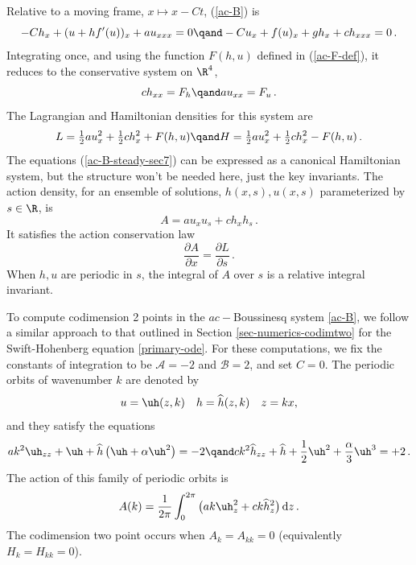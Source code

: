 \documentclass[10pt]{article}
\def\rd{{\rm d}} \def\re{{\rm e}} \def\fr{\mbox{$\frac{1}{2}$}}
\def\hh{\widehat {h}}
\def\iA{\mathscr{A}}
\def\iB{\mathscr{B}}
\begin{document}
Relative to a moving frame, $x\mapsto x-Ct$, (\ref{ac-B}) is
%
\begin{equation}\label{ac-B-sec7}
-Ch_x + (u + hf'(u))_x +a u_{xxx} =0\qand -C u_x + f(u)_x + gh_x + c h_{xxx} = 0\,.
\end{equation}
%
Integrating once, and using the function $F(h,u)$ defined in (\ref{ac-F-def}), it reduces to the conservative system on $\R^4$,
%
\begin{equation}\label{ac-B-steady-sec7}
c h_{xx} = F_h\qand a u_{xx} = F_u\,.
\end{equation}
%
The Lagrangian and Hamiltonian densities for this system are
%
\begin{equation}\label{LH-def-bouss}
L = \fr a u_x^2 + \fr c h_x^2 + F(h,u)\qand 
H = \fr a u_x^2 + \fr c h_x^2 - F(h,u)\,.
\end{equation}
%
The equations (\ref{ac-B-steady-sec7}) can be expressed as a canonical Hamiltonian system, but the structure won't be needed here, just the key invariants.  The action density, for an ensemble of solutions, $h(x,s),u(x,s)$ parameterized by $s\in\R$, is
%
\begin{equation}\label{action-bouss}
A = a u_x u_s + c h_x h_s\,.
\end{equation}
%
It satisfies the action conservation law 
%
\begin{equation}\label{action-claw}
\frac{\partial A}{\partial x} = \frac{\partial L}{\partial s}\,.
\end{equation}
%
When $h,u$ are periodic in $s$, the integral of $A$ over $s$ is a relative integral invariant.

To compute codimension 2 points
in the $ac-$Boussinesq system \eqref{ac-B}, we follow a similar
approach to that outlined in Section \ref{sec-numerics-codimtwo} for the
Swift-Hohenberg equation \eqref{primary-ode}. For these computations, we fix the constants of integration to be $\iA = -2$ and $\iB = 2$, and set $C=0$. The periodic orbits of wavenumber $k$ are denoted by
\begin{equation}
  u = \uh(z,k) \quad h = \hh(z,k) \quad z = kx,
\end{equation}
%
and they satisfy the equations
\begin{equation}\label{eq:steady-ac-bouss}
a k^2 \uh_{zz}  + \uh + \hh \left(\uh + \alpha \uh^2\right) = -2 \qand c k^2 \hh_{zz} + \hh  + \frac{1}{2}\uh^2 + \frac{\alpha}{3} \uh^3 = +2\,.
\end{equation}
%
The action of this family of periodic orbits is
%
\begin{equation}\label{action-B-per}
A(k) = \frac{1}{2\pi} \int_0^{2\pi} \big(ak\uh_z^2 +ck\hh_z^2\big)\,\rd z\,.
\end{equation}
%
The codimension two point occurs when ${A}_k=A_{kk}=0$ (equivalently $H_k=H_{kk}=0$).
\end{document}
